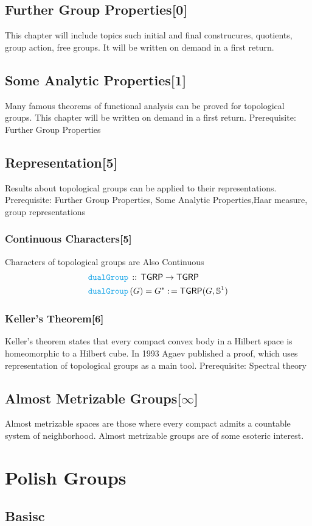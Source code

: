 \documentclass[12pt]{scrartcl}
\newcommand{\FUNC}[1]{\textcolor{Cerulean}{\mathtt{#1}}}
\renewcommand{\.}{\; . \;}
\newcommand{\de}{: \kern 0.1pc =}
\newcommand{\Act}[1]{\left( #1 \right)}
\newcommand{\DeclareFunc}[2]{& \FUNC{#1} \, :: \, #2 \\}
\newcommand{\DefineNamedFunc}[4]{&  \FUNC{#1}\Act{#2} = #3 \de #4 \\}
\newcommand{\Page}[1]{ \begin{align*} #1 \end{align*}   }
\newcommand{\Sphere}{\mathbb{S}}
\newcommand{\TGRP}{\mathsf{TGRP}}
\begin{document}
\subsection{Further Group Properties[0]} 
This chapter will include topics such 
initial and final construcures,
quotients, 
group action,
free groups.
It will be written on demand in a first return.
\subsection{Some Analytic Properties[1]}
Many famous theorems of functional analysis can be proved for topological groups.
This chapter will be written on demand in a first return.
Prerequisite: Further Group Properties
\newpage
\subsection{Representation[5]}
Results about topological groups can be applied to their representations.
Prerequisite: Further Group Properties, Some Analytic Properties,Haar measure, group representations
\subsubsection{Continuous Characters[5]}
Characters of topological groups are Also Continuous
\Page{
	\DeclareFunc{dualGroup}{\TGRP \to \TGRP}
	\DefineNamedFunc{dualGroup}{G}{G^*}{\TGRP(G,\Sphere^1)}
}
\newpage
\subsubsection{Keller's Theorem[6]}
Keller's theorem states that every compact convex body 
in a Hilbert space is homeomorphic to a Hilbert cube.
In 1993 Agaev published a proof, which uses representation of topological groups as a main tool. Prerequisite: Spectral theory
\subsection{Almost Metrizable Groups[$\infty$]}
Almost metrizable spaces are those where every compact admits a countable system of neighborhood. Almost metrizable groups are of some esoteric interest. 
\newpage
\section{Polish Groups}
\subsection{Basisc}
\end{document}
